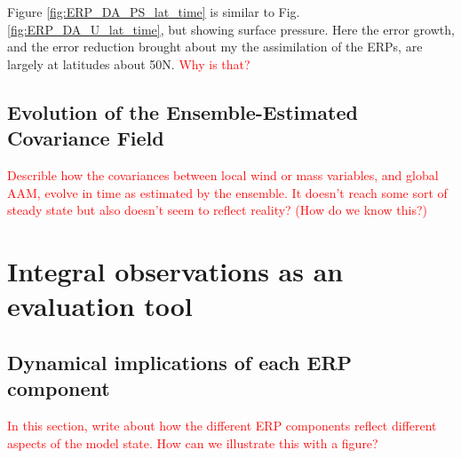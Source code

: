 \documentclass[draft,jgrga]{agutex}
\begin{document}
\begin{article}
Figure \ref{fig:ERP_DA_PS_lat_time} is similar to Fig. \ref{fig:ERP_DA_U_lat_time}, but showing surface pressure.
Here the error growth, and the error reduction brought about my the assimilation of the ERPs, are largely at latitudes about 50\degree N.
\textcolor{red}{Why is that?}

\subsection{Evolution of the Ensemble-Estimated Covariance Field}

\textcolor{red}{Describle how the covariances between local wind or mass variables, and global AAM, evolve in time as estimated by the ensemble.  It doesn't reach some sort of steady state but also doesn't seem to reflect reality?  (How do we know this?)}



\section{Integral observations as an evaluation tool}


\subsection{Dynamical implications of each ERP component} 
\textcolor{red}{In this section, write about how the different ERP components reflect different aspects of the model state.  How can we illustrate this with a figure?}



%
%
%
%
%
%
%


\end{article}
\end{document}
